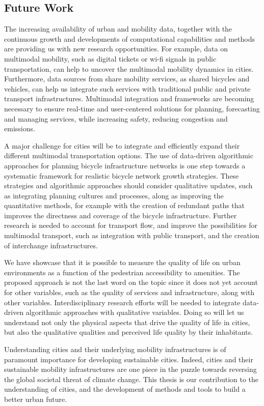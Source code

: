 \subsection*{Future Work}

The increasing availability of urban and mobility data, together with the continuous growth and developments of computational capabilities and methods are providing us with new research opportunities. For example, data on multimodal mobility, such as digital tickets or wi-fi signals in public transportation, can help to uncover the multimodal mobility dynamics in cities. Furthermore, data sources from share mobility services, as shared bicycles and vehicles, can help us integrate such services with traditional public and private transport infrastructures. Multimodal integration and frameworks are becoming necessary to ensure real-time and user-centered solutions for planning, forecasting and managing services, while increasing safety, reducing congestion and emissions.

A major challenge for cities will be to integrate and efficiently expand their different multimodal transportation options. The use of data-driven algorithmic approaches for planning bicycle infrastructure networks is one step towards a systematic framework for realistic bicycle network growth strategies. These strategies and algorithmic approaches should consider  qualitative updates, such as integrating planning cultures and processes, along as improving the quantitative methods, for example with the creation of redundant paths that improves the directness and coverage of the bicycle infrastructure. Further research is needed to account for transport flow, and improve the possibilities for multimodal transport, such as integration with public transport, and the creation of interchange infrastructures.

We have showcase that it is possible to measure the quality of life on urban environments as a function of the pedestrian accessibility to amenities. The proposed approach is not the last word on the topic since it does not yet account for other variables, such as the quality of services and infrastructure, along with other variables. Interdisciplinary research efforts will be needed to integrate data-driven algorithmic approaches with qualitative variables. Doing so will let us understand not only the physical aspects that drive the quality of life in cities, but also the qualitative qualities and perceived life quality by their inhabitants.

Understanding cities and their underlying mobility infrastructures is of paramount importance for developing sustainable cities. Indeed, cities and their sustainable mobility infrastructures are one piece in the puzzle towards reversing the global societal threat of climate change. This thesis is our contribution to the understanding of cities, and the development of methods and tools to build a better urban future. 

